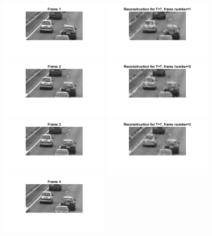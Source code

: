 \documentclass[a4paper,11pt]{article}
\numberwithin{definition}{section}
\numberwithin{mytheorem}{subsection}
\begin{document}
\begin{figure}[H]
    \centering
    \includegraphics[width=200px]{"Frame 1.png"}
    \includegraphics[width=200px]{"Reconstruction- T=7, frame number=1.png"}
    \includegraphics[width=200px]{"Frame 2.png"}
    \includegraphics[width=200px]{"Reconstruction- T=7, frame number=2.png"}
    \includegraphics[width=200px]{"Frame 3.png"}
    \includegraphics[width=200px]{"Reconstruction- T=7, frame number=3.png"}
    \includegraphics[width=200px]{"Frame 4.png"}

\end{figure}
\end{document}
